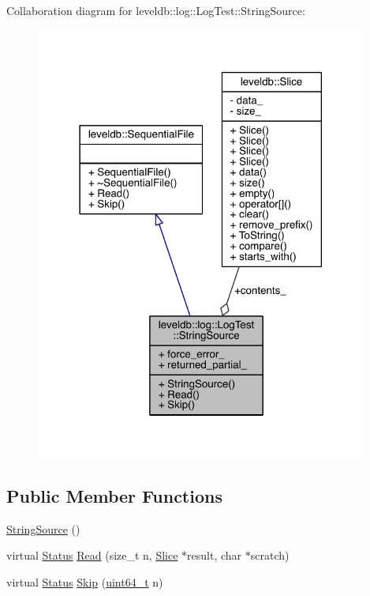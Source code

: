 Collaboration diagram for leveldb\+:\+:log\+:\+:Log\+Test\+:\+:String\+Source\+:\nopagebreak
\begin{figure}[H]
\begin{center}
\leavevmode
\includegraphics[width=310pt]{classleveldb_1_1log_1_1_log_test_1_1_string_source__coll__graph}
\end{center}
\end{figure}
\subsection*{Public Member Functions}
\begin{DoxyCompactItemize}
\item 
\hyperlink{classleveldb_1_1log_1_1_log_test_1_1_string_source_a85e7f1f81a71976d6f8d092930e9c671}{String\+Source} ()
\item 
virtual \hyperlink{classleveldb_1_1_status}{Status} \hyperlink{classleveldb_1_1log_1_1_log_test_1_1_string_source_a9a0ece28d3cc701007e4c816730deb6e}{Read} (size\+\_\+t n, \hyperlink{classleveldb_1_1_slice}{Slice} $\ast$result, char $\ast$scratch)
\item 
virtual \hyperlink{classleveldb_1_1_status}{Status} \hyperlink{classleveldb_1_1log_1_1_log_test_1_1_string_source_a33266e2d1e98780bd6a2720857a88100}{Skip} (\hyperlink{stdint_8h_aaa5d1cd013383c889537491c3cfd9aad}{uint64\+\_\+t} n)
\end{DoxyCompactItemize}
